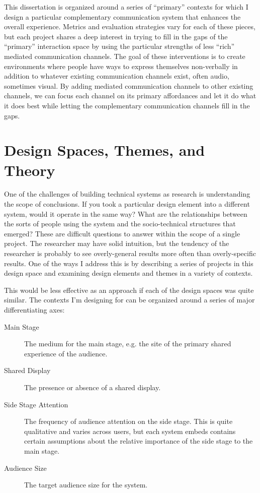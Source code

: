 This dissertation is organized around a series of ``primary'' contexts for which I design a particular complementary communication system that enhances the overall experience. Metrics and evaluation strategies vary for each of these pieces, but each project shares a deep interest in trying to fill in the gaps of the ``primary'' interaction space by using the particular strengths of less ``rich'' mediated communication channels. The goal of these interventions is to create environments where people have ways to express themselves non-verbally in addition to whatever existing communication channels exist, often audio, sometimes visual. By adding mediated communication channels to other existing channels, we can focus each channel on its primary affordances and let it do what it does best while letting the complementary communication channels fill in the gaps.




\section{Design Spaces, Themes, and Theory}

One of the challenges of building technical systems as research is understanding the scope of conclusions. If you took a particular design element into a different system, would it operate in the same way? What are the relationships between the sorts of people using the system and the socio-technical structures that emerged? These are difficult questions to answer within the scope of a single project. The researcher may have solid intuition, but the tendency of the researcher is probably to see overly-general results more often than overly-specific results. One of the ways I address this is by describing a series of projects in this design space and examining design elements and themes in a variety of contexts.

This would be less effective as an approach if each of the design spaces was quite similar. The contexts I'm designing for can be organized around a series of major differentiating axes:

\begin{description}
\item[Main Stage]{The medium for the main stage, e.g. the site of the primary shared experience of the audience.}
\item[Shared Display]{The presence or absence of a shared display.}
\item[Side Stage Attention]{The frequency of audience attention on the side stage. This is quite qualitative and varies across users, but each system embeds contains certain assumptions about the relative importance of the side stage to the main stage.}
\item[Audience Size]{The target audience size for the system.}
\end{description}

